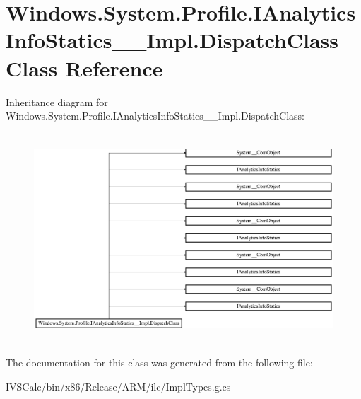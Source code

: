 \hypertarget{class_windows_1_1_system_1_1_profile_1_1_i_analytics_info_statics_____impl_1_1_dispatch_class}{}\section{Windows.\+System.\+Profile.\+I\+Analytics\+Info\+Statics\+\_\+\+\_\+\+Impl.\+Dispatch\+Class Class Reference}
\label{class_windows_1_1_system_1_1_profile_1_1_i_analytics_info_statics_____impl_1_1_dispatch_class}
Inheritance diagram for Windows.\+System.\+Profile.\+I\+Analytics\+Info\+Statics\+\_\+\+\_\+\+Impl.\+Dispatch\+Class\+:\begin{figure}[H]
\begin{center}
\leavevmode
\includegraphics[height=7.857142cm]{class_windows_1_1_system_1_1_profile_1_1_i_analytics_info_statics_____impl_1_1_dispatch_class}
\end{center}
\end{figure}


The documentation for this class was generated from the following file\+:\begin{DoxyCompactItemize}
\item 
I\+V\+S\+Calc/bin/x86/\+Release/\+A\+R\+M/ilc/Impl\+Types.\+g.\+cs\end{DoxyCompactItemize}
